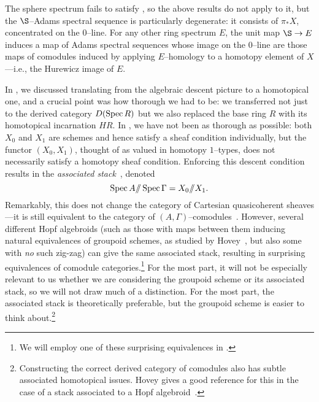 \begin{remark}\label{HurewiczRemark}
The sphere spectrum fails to satisfy {\CH}, so the above results do not apply to it, but the \(\S\)--Adams spectral sequence is particularly degenerate: it consists of \(\pi_* X\), concentrated on the \(0\)--line.  For any other ring spectrum \(E\), the unit map \(\S \to E\) induces a map of Adams spectral sequences whose image on the \(0\)--line are those maps of comodules induced by applying \(E\)--homology to a homotopy element of \(X\)---i.e., the Hurewicz image of \(E\).
\end{remark}

\begin{remark}\label{WarningAboutStacks}
In , we discussed translating from the algebraic descent picture to a homotopical one, and a crucial point was how thorough we had to be: we transferred not just to the derived category \(D(\operatorname{Spec} R)\) but we also replaced the base ring \(R\) with its homotopical incarnation \(HR\).  In , we have not been as thorough as possible: both \(X_0\) and \(X_1\) are schemes and hence satisfy a sheaf condition individually, but the functor \((X_0, X_1)\), thought of as valued in homotopy \(1\)--types, does not necessarily satisfy a homotopy sheaf condition.  Enforcing this descent condition results in the \textit{associated stack}~\cite[Definition 8.13]{HopkinsCOCTALOS}, denoted \[\operatorname{Spec} A /\!\!/ \operatorname{Spec} \Gamma = X_0 /\!\!/ X_1.\]  Remarkably, this does not change the category of Cartesian quasicoherent sheaves---it is still equivalent to the category of \((A, \Gamma)\)--comodules~\cite[Proposition 11.6]{HopkinsCOCTALOS}.  However, several different Hopf algebroids (such as those with maps between them inducing natural equivalences of groupoid schemes, as studied by Hovey~\cite[Theorem D]{HoveyMoritaThy}, but also some with \emph{no} such zig-zag) can give the same associated stack, resulting in surprising equivalences of comodule categories.\footnote{We will employ one of these surprising equivalences in .}  For the most part, it will not be especially relevant to us whether we are considering the groupoid scheme or its associated stack, so we will not draw much of a distinction.  For the most part, the associated stack is theoretically preferable, but the groupoid scheme is easier to think about.\footnote{Constructing the correct derived category of comodules also has subtle associated homotopical issues.  Hovey gives a good reference for this in the case of a stack associated to a Hopf algebroid~\cite{HoveyHomotopyOfComodules}.}
\end{remark}

